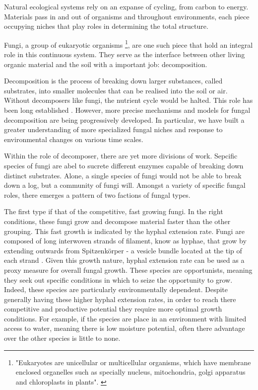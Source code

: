\documentclass[12pt]{article}
\begin{document}
\newpage
\begin{multicols}{2}
Natural ecological systems rely on an expanse of cycling, from carbon to energy. Materials pass in and out of organisms and throughout environments, each piece occupying niches that play roles in determining the total structure.

Fungi, a group of eukaryotic organisms \footnote{"Eukaryotes are unicellular or multicellular organisms, which have membrane enclosed organelles such as specially nucleus, mitochondria, golgi apparatus and chloroplasts in plants". \cite{Panawala2017}}, are one such piece that hold an integral role in this continuous system. They serve as the interface between other living organic material and the soil with a important job: decomposition.

Decomposition is the process of breaking down larger substances, called substrates, into smaller molecules that can be realised into the soil or air. Without decomposers like fungi, the nutrient cycle would be halted. This role has been long established \cite{Kakde2009}. However, more precise mechanisms and models for fungal decomposition are being progressively developed. In particular, we have built a greater understanding of more specialized fungal niches and response to environmental changes on various time scales.

Within the role of decomposer, there are yet more divisions of work. Sepcific species of fungi are abel to sucrete different enzymes capable of breaking down distinct substrates. Alone, a single species of fungi would not be able to break down a log, but a community of fungi will. Amongst a variety of specific fungal roles, there emerges a pattern of two factions of fungal types. %

The first type if that of the competitive, fast growing fungi. In the right conditions, these fungi grow and decompose material faster than the other grouping. This fast growth is indicated by the hyphal extension rate. Fungi are composed of long interwoven strands of filament, know as hyphae, that grow by extending outwards from Spitzenkörper - a vesicle bundle located at the tip of each strand \cite{Edelstein1982}. Given this growth nature, hyphal extension rate can be used as a proxy measure for overall fungal growth. These species are opportunists, meaning they seek out specific conditions in which to seize the opportunity to grow. Indeed, these species are particularly environmentally dependent. Despite generally having these higher hyphal extension rates, in order to reach there competitive and productive potential they require more optimal growth conditions. For example, if the species are place in an environment with limited access to water, meaning there is low moisture potential, often there advantage over the other species is little to none.


\end{multicols}
\end{document}
